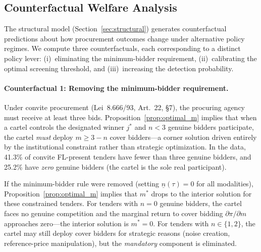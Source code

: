 
\subsection{Counterfactual Welfare Analysis} %
\label{sec:counterfactual}

The structural model (Section~\ref{sec:structural}) generates
counterfactual predictions about how procurement outcomes change under
alternative policy regimes. We compute three counterfactuals, each
corresponding to a distinct policy lever: (i)~eliminating the
minimum-bidder requirement, (ii)~calibrating the optimal screening
threshold, and (iii)~increasing the detection probability.


\paragraph{Counterfactual 1: Removing the minimum-bidder requirement.}
Under convite procurement (Lei~8.666/93, Art.~22, \S7), the procuring
agency must receive at least three bids. Proposition~\ref{prop:optimal_m}
implies that when a cartel controls the designated winner $j^*$ and
$n < 3$ genuine bidders participate, the cartel \emph{must} deploy
$m \geq 3 - n$ cover bidders---a corner solution driven entirely by
the institutional constraint rather than strategic optimization. In the
data, 41.3\% of convite FL-present tenders have fewer than three genuine
bidders, and 25.2\% have \emph{zero} genuine bidders (the cartel is the
sole real participant).

If the minimum-bidder rule were removed (setting $\underline{n}(\tau) =
0$ for all modalities), Proposition~\ref{prop:optimal_m} implies that
$m^*$ drops to the interior solution for these constrained tenders. For
tenders with $n = 0$ genuine bidders, the cartel faces no genuine
competition and the marginal return to cover bidding $\partial \pi /
\partial m$ approaches zero---the interior solution is $m^* = 0$. For
tenders with $n \in \{1, 2\}$, the cartel may still deploy cover
bidders for strategic reasons (noise creation, reference-price
manipulation), but the \emph{mandatory} component is eliminated.

